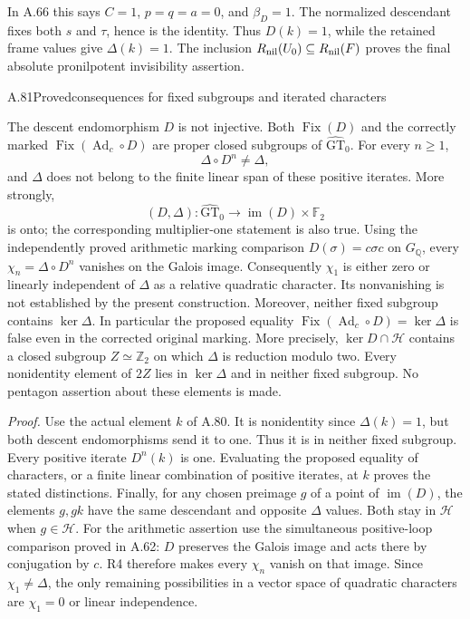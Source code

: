 In A.66 this says $C=1$, $p=q=a=0$, and $\beta_D=1$.
The normalized descendant fixes both $s$ and $\tau$, hence is
the identity. Thus $D(k)=1$, while the retained frame values
give $\Delta(k)=1$. The inclusion
$R_{\rm nil}(U_0)\subseteq R_{\rm nil}(F)$ proves the final
absolute pronilpotent invisibility assertion.

\begin{statement}{A.81}{Proved}{consequences for fixed subgroups and iterated characters}
\end{statement}
The descent endomorphism $D$ is not injective. Both
$\operatorname{Fix}(D)$ and the correctly marked
$\operatorname{Fix}(\operatorname{Ad}_c\circ D)$ are proper
closed subgroups of $\widehat{\mathrm{GT}}_0$. For every $n\geq1$,
\[
 \Delta\circ D^n\ne\Delta,
\]
and $\Delta$ does not belong to the finite linear span of these
positive iterates. More strongly,
\[
 (D,\Delta):\widehat{\mathrm{GT}}_0
       \longrightarrow\operatorname{im}(D)\times\mathbb F_2
\]
is onto; the corresponding multiplier-one statement is also true.
Using the independently proved arithmetic marking comparison
$D(\sigma)=c\sigma c$ on $G_{\mathbb Q}$, every
$\chi_n=\Delta\circ D^n$ vanishes on the Galois image.
Consequently $\chi_1$ is either zero or linearly independent of
$\Delta$ as a relative quadratic character. Its nonvanishing
is not established by the present construction.
Moreover, neither fixed subgroup contains $\ker\Delta$.
In particular the proposed equality
$\operatorname{Fix}(\operatorname{Ad}_c\circ D)=\ker\Delta$
is false even in the corrected original marking. More precisely,
$\ker D\cap\mathcal H$ contains a closed subgroup
$Z\simeq\mathbb Z_2$ on which $\Delta$ is reduction modulo two.
Every nonidentity element of $2Z$ lies in $\ker\Delta$ and in
neither fixed subgroup. No pentagon assertion about these
elements is made.

\emph{Proof.}
Use the actual element $k$ of A.80. It is nonidentity since
$\Delta(k)=1$, but both descent endomorphisms send it to one.
Thus it is in neither fixed subgroup. Every positive iterate
$D^n(k)$ is one. Evaluating the proposed equality of characters,
or a finite linear combination of positive iterates, at $k$
proves the stated distinctions. Finally, for any chosen preimage
$g$ of a point of $\operatorname{im}(D)$, the elements $g,gk$
have the same descendant and opposite $\Delta$ values.
Both stay in $\mathcal H$ when $g\in\mathcal H$.
For the arithmetic assertion use the simultaneous positive-loop
comparison proved in A.62: $D$ preserves the Galois image and
acts there by conjugation by $c$. R4 therefore makes every
$\chi_n$ vanish on that image. Since $\chi_1\ne\Delta$,
the only remaining possibilities in a vector space of quadratic
characters are $\chi_1=0$ or linear independence.

